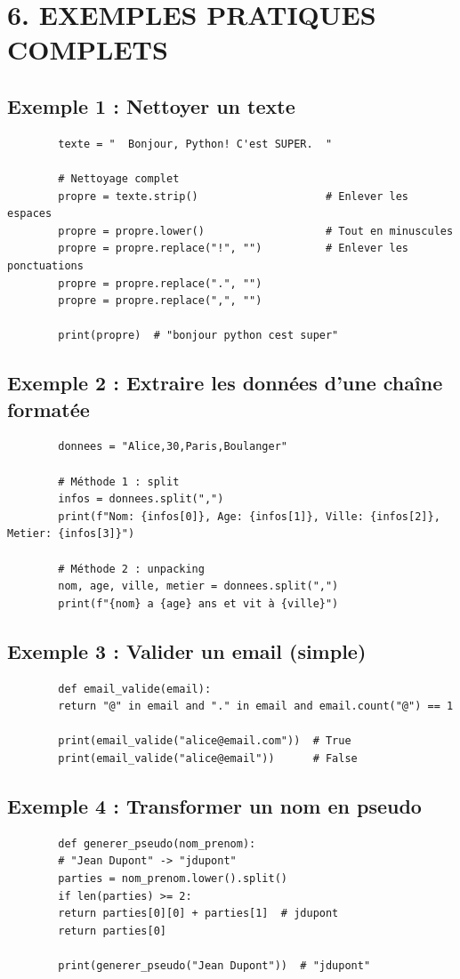 \documentclass[12pt,a4paper]{article}
\begin{document}
	\section*{\color{orange}6. EXEMPLES PRATIQUES COMPLETS}
	
	\subsection*{\color{cyan}Exemple 1 : Nettoyer un texte}
	\begin{lstlisting}
		texte = "  Bonjour, Python! C'est SUPER.  "
		
		# Nettoyage complet
		propre = texte.strip()                    # Enlever les espaces
		propre = propre.lower()                   # Tout en minuscules
		propre = propre.replace("!", "")          # Enlever les ponctuations
		propre = propre.replace(".", "")
		propre = propre.replace(",", "")
		
		print(propre)  # "bonjour python cest super"
	\end{lstlisting}
	
	\subsection*{\color{cyan}Exemple 2 : Extraire les données d'une chaîne formatée}
	\begin{lstlisting}
		donnees = "Alice,30,Paris,Boulanger"
		
		# Méthode 1 : split
		infos = donnees.split(",")
		print(f"Nom: {infos[0]}, Age: {infos[1]}, Ville: {infos[2]}, Metier: {infos[3]}")
		
		# Méthode 2 : unpacking
		nom, age, ville, metier = donnees.split(",")
		print(f"{nom} a {age} ans et vit à {ville}")
	\end{lstlisting}
	
	\subsection*{\color{cyan}Exemple 3 : Valider un email (simple)}
	\begin{lstlisting}
		def email_valide(email):
		return "@" in email and "." in email and email.count("@") == 1
		
		print(email_valide("alice@email.com"))  # True
		print(email_valide("alice@email"))      # False
	\end{lstlisting}
	
	\subsection*{\color{cyan}Exemple 4 : Transformer un nom en pseudo}
	\begin{lstlisting}
		def generer_pseudo(nom_prenom):
		# "Jean Dupont" -> "jdupont"
		parties = nom_prenom.lower().split()
		if len(parties) >= 2:
		return parties[0][0] + parties[1]  # jdupont
		return parties[0]
		
		print(generer_pseudo("Jean Dupont"))  # "jdupont"
	\end{lstlisting}
	
\end{document}
